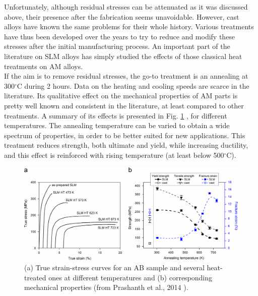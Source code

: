 Unfortunately, although residual stresses can be attenuated as it was discussed above, their presence after the fabrication seems unavoidable. However, cast alloys have known the same problems for their whole history. Various treatments have thus been developed over the years to try to reduce and modify these stresses after the initial manufacturing process. An important part of the literature on SLM alloys has simply studied the effects of those classical heat treatments on AM alloys.\\

If the aim is to remove residual stresses, the go-to treatment is an annealing at 300$^\circ$C during 2 hours. Data on the heating and cooling speeds are scarce in the literature. Its qualitative effect on the mechanical properties of AM parts is pretty well known and consistent in the literature, at least compared to other treatments. A summary of its effects is presented in Fig. \ref{fig:mech_annealing} \cite{PRASHANTH14}, for different temperatures. The annealing temperature can be varied to obtain a wide spectrum of properties, in order to be better suited for new applications. This treatment reduces strength, both ultimate and yield, while increasing ductility, and this effect is reinforced with rising temperature (at least below 500$^\circ$C). \\

\begin{figure}[ht]
	\centering
	\includegraphics[scale=0.30]{Images/mech_annealing}
	\decoRule
	\caption[(a) True strain-stress curves for an AB sample and several heat-treated ones at different temperatures and (b) corresponding mechanical properties]{(a) True strain-stress curves for an AB sample and several heat-treated ones at different temperatures and (b) corresponding mechanical properties (from Prashanth et al., 2014 \parencite{PRASHANTH14}).}
	\label{fig:mech_annealing}
\end{figure}

